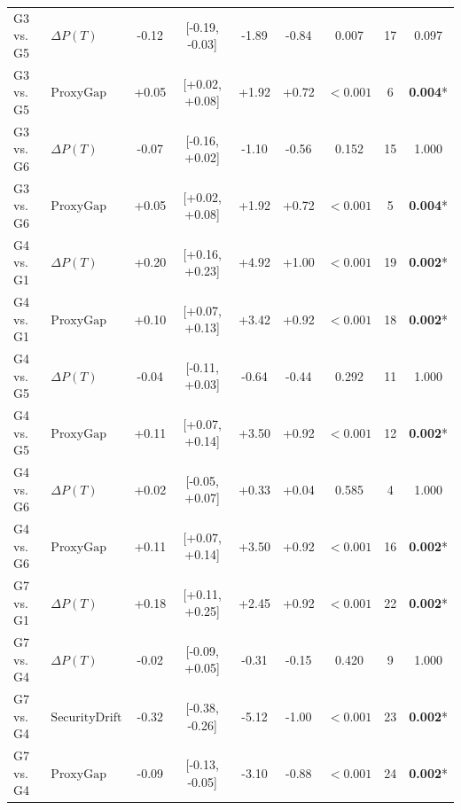 \begin{table}[t]
\begin{tabular}{llccccccc}
G3 vs. G5 & $\Delta P(T)$ & -0.12 & [-0.19, -0.03] & -1.89 & -0.84 & 0.007 & 17 & 0.097 \\
G3 vs. G5 & $\text{ProxyGap}$ & +0.05 & [+0.02, +0.08] & +1.92 & +0.72 & $<0.001$ & 6 & \textbf{0.004}* \\
G3 vs. G6 & $\Delta P(T)$ & -0.07 & [-0.16, +0.02] & -1.10 & -0.56 & 0.152 & 15 & 1.000 \\
G3 vs. G6 & $\text{ProxyGap}$ & +0.05 & [+0.02, +0.08] & +1.92 & +0.72 & $<0.001$ & 5 & \textbf{0.004}* \\
G4 vs. G1 & $\Delta P(T)$ & +0.20 & [+0.16, +0.23] & +4.92 & +1.00 & $<0.001$ & 19 & \textbf{0.002}* \\
G4 vs. G1 & $\text{ProxyGap}$ & +0.10 & [+0.07, +0.13] & +3.42 & +0.92 & $<0.001$ & 18 & \textbf{0.002}* \\
G4 vs. G5 & $\Delta P(T)$ & -0.04 & [-0.11, +0.03] & -0.64 & -0.44 & 0.292 & 11 & 1.000 \\
G4 vs. G5 & $\text{ProxyGap}$ & +0.11 & [+0.07, +0.14] & +3.50 & +0.92 & $<0.001$ & 12 & \textbf{0.002}* \\
G4 vs. G6 & $\Delta P(T)$ & +0.02 & [-0.05, +0.07] & +0.33 & +0.04 & 0.585 & 4 & 1.000 \\
G4 vs. G6 & $\text{ProxyGap}$ & +0.11 & [+0.07, +0.14] & +3.50 & +0.92 & $<0.001$ & 16 & \textbf{0.002}* \\
\midrule
G7 vs. G1 & $\Delta P(T)$ & +0.18 & [+0.11, +0.25] & +2.45 & +0.92 & $<0.001$ & 22 & \textbf{0.002}* \\
G7 vs. G4 & $\Delta P(T)$ & -0.02 & [-0.09, +0.05] & -0.31 & -0.15 & 0.420 & 9 & 1.000 \\
G7 vs. G4 & $\text{SecurityDrift}$ & -0.32 & [-0.38, -0.26] & -5.12 & -1.00 & $<0.001$ & 23 & \textbf{0.002}* \\
G7 vs. G4 & $\text{ProxyGap}$ & -0.09 & [-0.13, -0.05] & -3.10 & -0.88 & $<0.001$ & 24 & \textbf{0.002}* \\
\bottomrule
\end{tabular}
\end{table}
